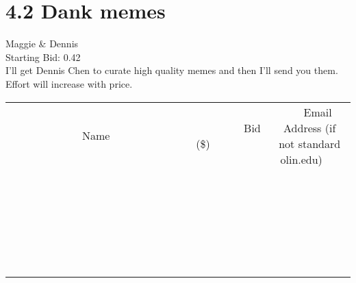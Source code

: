 \documentclass[11pt]{article}
\begin{document}
					\section*{4.2 Dank memes}
					Maggie \& Dennis \\
					Starting Bid: 0.42 \\
					I'll get Dennis Chen to curate high quality memes and then I'll send you them. Effort will increase with price. \\
					[6ex]
					\begin{tabular}{c c c}
						~~~~~~~~~~~~~Name~~~~~~~~~~~~~ & ~~~~~~~~~Bid (\$)~~~~~~~~~ & ~~~Email Address (if not standard olin.edu)~~~ \\
				
 & & \\
\hline
 & & \\
\hline
 & & \\
\hline
 & & \\
\hline
 & & \\
\hline
 & & \\
\hline
 & & \\
\hline
 & & \\
\hline
 & & \\
\hline
 & & \\
\hline
 & & \\
\hline
 & & \\
\hline
 & & \\
\hline
 & & \\
\hline
 & & \\
\hline
 & & \\
\hline
 & & \\
\hline
 & & \\
\hline
 & & \\
\hline
 & & \\
\hline
 & & \\
\hline
 & & \\
\hline
 & & \\
\hline
 & & \\
\hline
 & & \\
\hline
 & & \\
\hline
					\end{tabular}
					\clearpage
				
\end{document}

